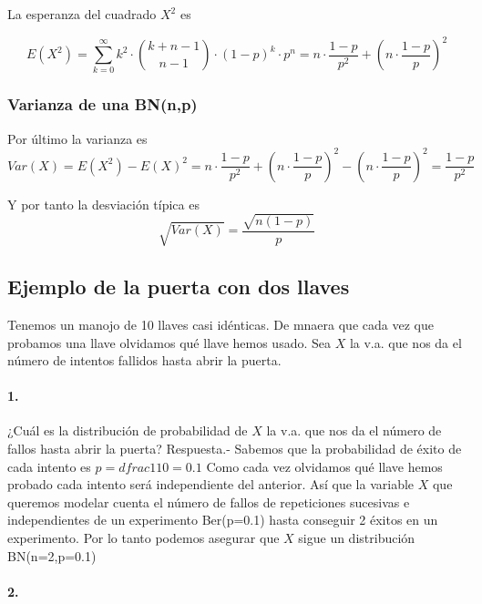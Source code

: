 \documentclass[
]{article}
\begin{document}
La esperanza del cuadrado \(X^2\) es

\[E(X^2) = \sum\limits_{k=0}^\infty k^2 \cdot {k+n-1 \choose n-1} \cdot (1-p)^k \cdot p^n = n\cdot \dfrac{1-p}{p^2} + \left(n\cdot \dfrac{1-p}{p}\right)^2\]

\hypertarget{varianza-de-una-bnnp}{%
\subsubsection{Varianza de una BN(n,p)}\label{varianza-de-una-bnnp}}

Por último la varianza es
\[Var(X) = E(X^2)-E(X)^2 = n\cdot \dfrac{1-p}{p^2}+\left(n\cdot \dfrac{1-p}{p}\right)^2 - \left(n\cdot \dfrac{1-p}{p}\right)^2 = \dfrac{1-p}{p^2}\]

Y por tanto la desviación típica es
\[\sqrt{Var(X)} = \dfrac{\sqrt{n(1-p)}}{p}\]

\hypertarget{ejemplo-de-la-puerta-con-dos-llaves}{%
\subsection{Ejemplo de la puerta con dos
llaves}\label{ejemplo-de-la-puerta-con-dos-llaves}}

Tenemos un manojo de 10 llaves casi idénticas. De mnaera que cada vez
que probamos una llave olvidamos qué llave hemos usado. Sea \(X\) la
v.a. que nos da el número de intentos fallidos hasta abrir la puerta.

\hypertarget{section}{%
\paragraph{1.}\label{section}}

¿Cuál es la distribución de probabilidad de \(X\) la v.a. que nos da el
número de fallos hasta abrir la puerta? Respuesta.- Sabemos que la
probabilidad de éxito de cada intento es \(p=dfrac{1}{10} = 0.1\) Como
cada vez olvidamos qué llave hemos probado cada intento será
independiente del anterior. Así que la variable \(X\) que queremos
modelar cuenta el número de fallos de repeticiones sucesivas e
independientes de un experimento Ber(p=0.1) hasta conseguir 2 éxitos en
un experimento. Por lo tanto podemos asegurar que \(X\) sigue un
distribución BN(n=2,p=0.1)

\hypertarget{section-1}{%
\paragraph{2.}\label{section-1}}
\end{document}
